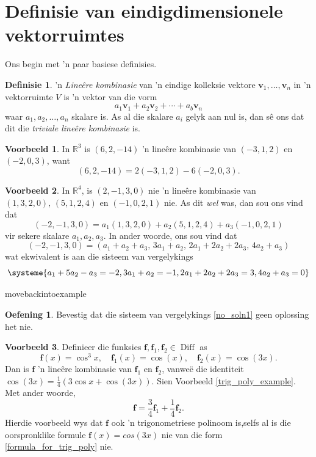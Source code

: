 \documentclass[a4paper,11pt]{book}
\theoremstyle{definition}
\newtheorem{definition}[theorem]{Definisie}
\newtheorem{exercise}{Oefening}
\newtheorem{example_environment}{Voorbeeld}[chapter]
\newcommand{\be}{\begin{equation}}
\newcommand{\ee}{\end{equation}}
\newcommand{\ve}[1]{\mathbf{#1}}
\newenvironment{example}
	{
		\begin{oframed}
		\begin{example_environment}
	}
	{
		\end{example_environment}
		\end{oframed}
	}
\DeclareMathOperator{\Diff}{Diff}
\begin{document}
\section{Definisie van eindigdimensionele vektorruimtes} \label{ACh2Sec1DefFinDimVectorSpaces}
Ons begin met 'n paar basiese definisies.
\begin{definition} 'n \emph{Line{\^e}re kombinasie} van 'n eindige
	kolleksie vektore $\ve{v}_1, \ldots, \ve{v}_n$ in 'n vektorruimte $V$
	is 'n vektor van die vorm
	\be
		a_1 \ve{v}_1 + a_2 \ve{v}_2 + \cdots + a_b \ve{v}_n
	\ee
	waar $a_1, a_2, \ldots, a_n$ skalare is. As al die skalare $a_i$ gelyk
	aan nul is, dan s{\^e} ons dat dit die \emph{triviale line{\^e}re
	kombinasie} is.	
\end{definition}
\begin{example} In $\mathbb{R}^3$ is $(6, 2, -14)$ 'n line{\^e}re
	kombinasie van $(-3, 1, 2)$ en $(-2, 0, 3)$, want
	\[
		(6, 2, -14) = 2 (-3, 1, 2) -6 (-2, 0, 3).
	\]
\end{example}
\begin{example} In $\mathbb{R}^4$, is $(2, -1, 3, 0)$ nie 'n line{\^e}re
	kombinasie van $(1, 3, 2, 0), \, (5, 1, 2, 4)$ en $(-1, 0, 2, 1)$ nie.
	As dit \emph{wel} was, dan sou ons vind dat
	\[
		(-2, -1, 3, 0) = a_1 (1, 3, 2, 0) + a_2 (5, 1, 2, 4) + a_3 (-1, 0,
		2, 1)
	\]
	vir sekere skalare $a_1, a_2, a_3$. In ander woorde, ons sou vind dat
	\[
		(-2, -1, 3, 0) = (a_1 + a_2 + a_3, \, 3a_1 + a_2, \, 2a_1 + 2a_2 +
		2a_3, \, 4a_2 + a_3)
	\]
	wat ekwivalent is aan die sisteem van vergelykings
	\be \label{no_soln1}
	\systeme{a_1 + 5a_2 -a_3 = -2, 3a_1 + a_2 = -1, 2a_1 + 2a_2 + 2a_3 = 3,
	4a_2 + a_3 = 0}
	\ee

\end{example}movebackintoexample
	\begin{exercise} Bevestig dat die sisteem van vergelykings
	\eqref{no_soln1} geen oplossing het nie.
\end{exercise}
\begin{example} Definieer die funksies $\ve{f}, \ve{f}_1, \ve{f}_2 \in
	\Diff$ as
	\[
		\ve{f}(x) = \cos^3 x, \quad \ve{f}_1 (x) = \cos (x), \quad \ve{f}_2
		(x) = \cos (3x).
	\]
	Dan is  $\ve{f}$ 'n line{\^e}re kombinasie van $\ve{f}_1$ en
	$\ve{f}_2$, vanwe{\"e} die identiteit $\cos(3x) = \frac{1}{4} (3 \cos x
	+ \cos(3x))$. Sien Voorbeeld \ref{trig_poly_example}. Met ander woorde,
	\[
		\ve{f} = \frac{3}{4} \ve{f}_1 + \frac{1}{4} \ve{f}_2 .
	\]
	Hierdie voorbeeld wys dat $\ve{f}$ ook 'n trigonometriese polinoom
	is,selfs al is die oorspronklike formule $\ve{f}(x) = cos(3x)$ nie van
	die form \eqref{formula_for_trig_poly} nie.
\end{example}
\end{document}
